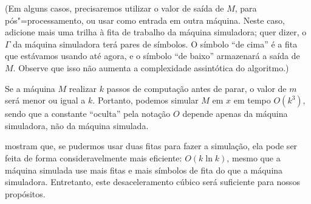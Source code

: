 (Em alguns casos, precisaremos utilizar o valor de saída de $M$,
para pós"=processamento, ou usar como entrada em outra máquina.
Neste caso,
adicione mais uma trilha à fita de trabalho da máquina simuladora;
quer dizer, o $\Gamma$ da máquina simuladora terá pares de símbolos.
O símbolo ``de cima'' é a fita que estávamos usando até agora,
e o símbolo ``de baixo'' armazenará a saída de $M$.
Observe que isso não aumenta a complexidade assintótica do algoritmo.)

Se a máquina $M$ realizar $k$ passos de computação antes de parar,
o valor de $m$ será menor ou igual a $k$.
Portanto,
podemos simular $M$ em $x$ em tempo $O(k^3)$,
sendo que a constante ``oculta'' pela notação $O$ depende apenas da máquina simuladora,
não da máquina simulada.

mostram que, se pudermos usar duas fitas para fazer a simulação,
ela pode ser feita de forma consideravelmente mais eficiente:
$O(k \ln k)$,
mesmo que a máquina simulada use mais fitas e mais símbolos de fita
do que a máquina simuladora.
Entretanto,
este desaceleramento cúbico será suficiente para nossos propósitos.
